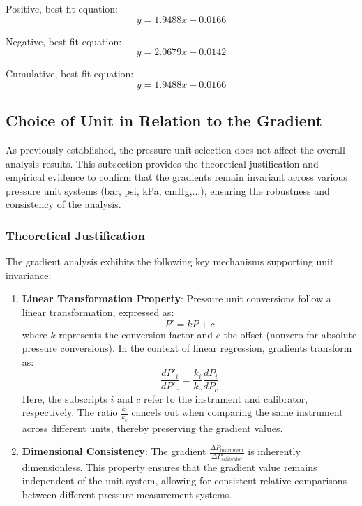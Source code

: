 \documentclass{article}
\begin{document}
\begin{center}
	\hspace*{-2em}
	\begin{minipage}{1.1\textwidth}
		\begin{minipage}{0.3\textwidth}	\centering
			Positive, best-fit equation: 
			\[y = 1.9488x-0.0166\]
		\end{minipage}\hfill
		\begin{minipage}{0.3\textwidth}	\centering
			Negative, best-fit equation: 
			\[y = 2.0679x-0.0142\]
		\end{minipage}\hfill
		\begin{minipage}{0.3\textwidth}	\centering
			Cumulative, best-fit equation: 
			\[y = 1.9488x-0.0166\]
		\end{minipage}
	\end{minipage}
\end{center}
	
\subsection{Choice of Unit in Relation to the Gradient}\label{consistency}
As previously established, the pressure unit selection does not affect the overall analysis results. This subsection provides the theoretical justification and empirical evidence to confirm that the gradients remain invariant across various pressure unit systems (bar, psi, kPa, cmHg,...), ensuring the robustness and consistency of the analysis.

\subsubsection{Theoretical Justification}
The gradient analysis exhibits the following key mechanisms supporting unit invariance:

\begin{enumerate}
	\item \textbf{Linear Transformation Property}: 
	Pressure unit conversions follow a linear transformation, expressed as:
	\begin{equation}
		P' = kP + c
	\end{equation}
	where $k$ represents the conversion factor and $c$ the offset (nonzero for absolute pressure conversions). In the context of linear regression, gradients transform as:
	\begin{equation}
		\frac{dP'_i}{dP'_c} = \frac{k_i}{k_c} \frac{dP_i}{dP_c}
	\end{equation}
	Here, the subscripts $i$ and $c$ refer to the instrument and calibrator, respectively. The ratio $\frac{k_i}{k_c}$ cancels out when comparing the same instrument across different units, thereby preserving the gradient values.
	
	\item \textbf{Dimensional Consistency}: 
	The gradient $\frac{\Delta P_{\text{instrument}}}{\Delta P_{\text{calibrator}}}$ is inherently dimensionless. This property ensures that the gradient value remains independent of the unit system, allowing for consistent relative comparisons between different pressure measurement systems.
\end{enumerate}
\end{document}
